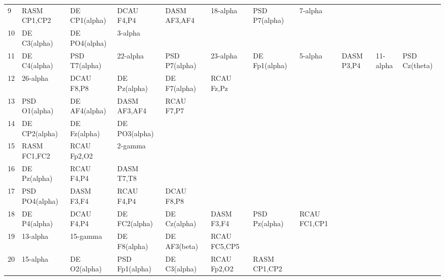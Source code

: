 \begin{landscape}
\begin{table}[]
\begin{tabular}{l|llllllll}
9        & RASM CP1,CP2   & DE CP1(alpha)  & DCAU F4,P4     & DASM AF3,AF4   & 18-alpha       & PSD P7(alpha)  & 7-alpha       &                &               &               \\
10       & DE C3(alpha)   & DE PO4(alpha)  & 3-alpha        &                &                &                &               &                &               &               \\
11       & DE C4(alpha)   & PSD T7(alpha)  & 22-alpha       & PSD P7(alpha)  & 23-alpha       & DE Fp1(alpha)  & 5-alpha       & DASM P3,P4     & 11-alpha      & PSD Cz(theta) \\
12       & 26-alpha       & DCAU F8,P8     & DE Pz(alpha)   & DE F7(alpha)   & RCAU Fz,Pz     &                &               &                &               &               \\
13       & PSD O1(alpha)  & DE AF4(alpha)  & DASM AF3,AF4   & RCAU F7,P7     &                &                &               &                &               &               \\
14       & DE CP2(alpha)  & DE Fz(alpha)   & DE PO3(alpha)  &                &                &                &               &                &               &               \\
15       & RASM FC1,FC2   & RCAU Fp2,O2    & 2-gamma        &                &                &                &               &                &               &               \\
16       & DE Pz(alpha)   & RCAU F4,P4     & DASM T7,T8     &                &                &                &               &                &               &               \\
17       & PSD PO4(alpha) & DASM F3,F4     & RCAU F4,P4     & DCAU F8,P8     &                &                &               &                &               &               \\
18       & DE P4(alpha)   & DCAU F4,P4     & DE FC2(alpha)  & DE Cz(alpha)   & DASM F3,F4     & PSD Pz(alpha)  & RCAU FC1,CP1  &                &               &               \\
19       & 13-alpha       & 15-gamma       & DE F8(alpha)   & DE AF3(beta)   & RCAU FC5,CP5   &                &               &                &               &               \\
20       & 15-alpha       & DE O2(alpha)   & PSD Fp1(alpha) & DE C3(alpha)   & RCAU Fp2,O2    & RASM CP1,CP2   &               &                &               &               \\

\end{tabular}
\end{table}
\end{landscape}
